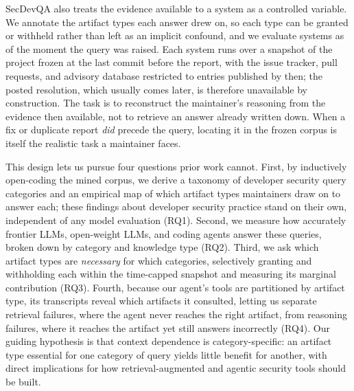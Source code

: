 SecDevQA also treats the evidence available to a system as a controlled variable. We annotate the artifact types each answer drew on, so each type can be granted or withheld rather than left as an implicit confound, and we evaluate systems as of the moment the query was raised. Each system runs over a snapshot of the project frozen at the last commit before the report, with the issue tracker, pull requests, and advisory database restricted to entries published by then; the posted resolution, which usually comes later, is therefore unavailable by construction. The task is to reconstruct the maintainer's reasoning from the evidence then available, not to retrieve an answer already written down. When a fix or duplicate report \emph{did} precede the query, locating it in the frozen corpus is itself the realistic task a maintainer faces.

This design lets us pursue four questions prior work cannot. First, by inductively open-coding the mined corpus, we derive a taxonomy of developer security query categories and an empirical map of which artifact types maintainers draw on to answer each; these findings about developer security practice stand on their own, independent of any model evaluation (RQ1). Second, we measure how accurately frontier LLMs, open-weight LLMs, and coding agents answer these queries, broken down by category and knowledge type (RQ2). Third, we ask which artifact types are \emph{necessary} for which categories, selectively granting and withholding each within the time-capped snapshot and measuring its marginal contribution (RQ3). Fourth, because our agent's tools are partitioned by artifact type, its transcripts reveal which artifacts it consulted, letting us separate retrieval failures, where the agent never reaches the right artifact, from reasoning failures, where it reaches the artifact yet still answers incorrectly (RQ4). Our guiding hypothesis is that context dependence is category-specific: an artifact type essential for one category of query yields little benefit for another, with direct implications for how retrieval-augmented and agentic security tools should be built.

